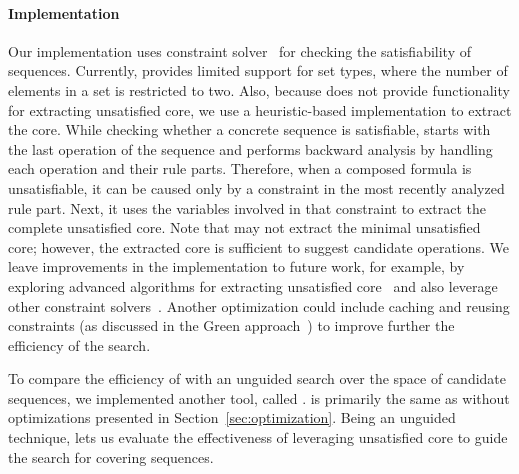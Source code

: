 \paragraph*{Implementation} Our implementation \tool{}  uses \choco{} constraint
solver~\cite{Choco} for checking the satisfiability of sequences.  Currently,
\tool{} provides limited support for set types, where the number of elements in
a set is restricted to two. Also, because \choco{} does not provide
functionality for extracting unsatisfied core, we use a heuristic-based
implementation to extract the core. While checking whether a concrete sequence
is satisfiable, \tool{} starts with the last operation of the sequence and
performs backward analysis by handling each operation and their rule
parts. Therefore, when a composed formula is unsatisfiable, it can be caused
only by a constraint in the most recently analyzed rule part. Next,
it uses the variables involved in that constraint to extract the complete
unsatisfied core. Note that \tool{} may not extract the minimal unsatisfied
core; however, the extracted core is sufficient to suggest candidate
operations. We leave improvements in the implementation to future work, for
example, by exploring advanced algorithms for extracting unsatisfied
core~\cite{Liffiton:2008:ACM} and also leverage other constraint
solvers~\cite{DeMoura:2008}. Another optimization could include caching and
reusing constraints (\eg as discussed in the Green approach~\cite{VisserGD12})
to improve further the efficiency of the search.

To compare the efficiency of \tool{} with an unguided search
over the space of candidate sequences, we implemented another tool, called
\exhaust{}. \exhaust{} is primarily the same as \tool{} without optimizations
presented in Section~\ref{sec:optimization}. Being an unguided technique, \exhaust{} lets us evaluate the
effectiveness of leveraging unsatisfied core to guide the search for covering
sequences.

